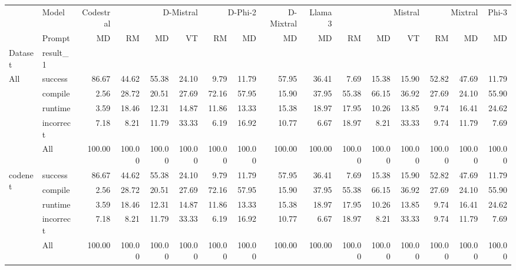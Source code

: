 \begin{tabular}{llrrrrrrrrrrrrrr}
\toprule
 & Model & Codestral & \multicolumn{3}{r}{D-Mistral} & \multicolumn{2}{r}{D-Phi-2} & D-Mixtral & Llama 3 & \multicolumn{3}{r}{Mistral} & \multicolumn{2}{r}{Mixtral} & Phi-3 \\
 & Prompt & MD & RM & MD & VT & RM & MD & MD & MD & RM & MD & VT & RM & MD & MD \\
Dataset & result_1 &  &  &  &  &  &  &  &  &  &  &  &  &  &  \\
\midrule
\multirow[t]{5}{*}{All} & success & 86.67 & 44.62 & 55.38 & 24.10 & 9.79 & 11.79 & 57.95 & 36.41 & 7.69 & 15.38 & 15.90 & 52.82 & 47.69 & 11.79 \\
 & compile & 2.56 & 28.72 & 20.51 & 27.69 & 72.16 & 57.95 & 15.90 & 37.95 & 55.38 & 66.15 & 36.92 & 27.69 & 24.10 & 55.90 \\
 & runtime & 3.59 & 18.46 & 12.31 & 14.87 & 11.86 & 13.33 & 15.38 & 18.97 & 17.95 & 10.26 & 13.85 & 9.74 & 16.41 & 24.62 \\
 & incorrect & 7.18 & 8.21 & 11.79 & 33.33 & 6.19 & 16.92 & 10.77 & 6.67 & 18.97 & 8.21 & 33.33 & 9.74 & 11.79 & 7.69 \\
 & All & 100.00 & 100.00 & 100.00 & 100.00 & 100.00 & 100.00 & 100.00 & 100.00 & 100.00 & 100.00 & 100.00 & 100.00 & 100.00 & 100.00 \\
\cline{1-16}
\multirow[t]{5}{*}{codenet} & success & 86.67 & 44.62 & 55.38 & 24.10 & 9.79 & 11.79 & 57.95 & 36.41 & 7.69 & 15.38 & 15.90 & 52.82 & 47.69 & 11.79 \\
 & compile & 2.56 & 28.72 & 20.51 & 27.69 & 72.16 & 57.95 & 15.90 & 37.95 & 55.38 & 66.15 & 36.92 & 27.69 & 24.10 & 55.90 \\
 & runtime & 3.59 & 18.46 & 12.31 & 14.87 & 11.86 & 13.33 & 15.38 & 18.97 & 17.95 & 10.26 & 13.85 & 9.74 & 16.41 & 24.62 \\
 & incorrect & 7.18 & 8.21 & 11.79 & 33.33 & 6.19 & 16.92 & 10.77 & 6.67 & 18.97 & 8.21 & 33.33 & 9.74 & 11.79 & 7.69 \\
 & All & 100.00 & 100.00 & 100.00 & 100.00 & 100.00 & 100.00 & 100.00 & 100.00 & 100.00 & 100.00 & 100.00 & 100.00 & 100.00 & 100.00 \\
\cline{1-16}
\bottomrule
\end{tabular}
